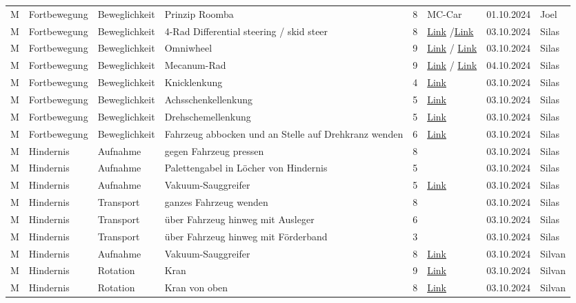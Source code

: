 \documentclass[../main.tex]{subfiles}
\begin{document}
\begin{longtable}{lp{2cm}p{2cm}p{4cm}clcl}
M & Fortbewegung & Beweglichkeit & Prinzip Roomba & 8 & MC-Car & 01.10.2024 & Joel
\tabularnewline
M & Fortbewegung & Beweglichkeit & 4-Rad Differential steering / \newline skid steer & 8 & \href{https://en.wikipedia.org/wiki/Differential_steering}{Link} /\href{https://science.howstuffworks.com/transport/engines-equipment/skid-steer2.htm}{Link} & 03.10.2024 & Silas
\tabularnewline
M & Fortbewegung & Beweglichkeit & Omniwheel & 9 & \href{https://de.wikipedia.org/wiki/Allseitenrad}{Link} / \href{https://www.youtube.com/watch?v=wwQQnSWqB7A}{Link} & 03.10.2024 & Silas
\tabularnewline
M & Fortbewegung & Beweglichkeit & Mecanum-Rad & 9 & \href{https://de.wikipedia.org/wiki/Mecanum-Rad}{Link} / \href{https://www.youtube.com/watch?v=noqBUEgyQ8A}{Link} & 04.10.2024 & Silas
\tabularnewline
M & Fortbewegung & Beweglichkeit & Knicklenkung & 4 & \href{https://de.wikipedia.org/wiki/Knicklenkung}{Link} & 03.10.2024 & Silas
\tabularnewline
M & Fortbewegung & Beweglichkeit & Achsschenkellenkung & 5 & \href{https://de.wikipedia.org/wiki/Achsschenkel}{Link} & 03.10.2024 & Silas
\tabularnewline
M & Fortbewegung & Beweglichkeit & Drehschemellenkung & 5 & \href{https://www.staplerberater.de/auswahlkriterien/lenkungsarten}{Link} & 03.10.2024 & Silas
\tabularnewline
M & Fortbewegung & Beweglichkeit & Fahrzeug abbocken und an Stelle auf Drehkranz wenden & 6 & \href{https://www.kaiserkraft.ch/hubgeraete/hub-und-verladetische/auto-niveaugeraet-mit-drehscheibe/drehscheiben-1110-mm/p/M1142876/?articleNumber=118558&lang=de_CH&customerType=B2C&lang=&infinity=ict2~net~gaw~cmp~PM_DE-shopping24-Jarvis-0~ag~~ar~~kw~~mt~&gad_source=1&gclid=CjwKCAjwgfm3BhBeEiwAFfxrGxsQhJoEWwY3dNM_OYKFg2NOgoHXLP2OeyLmOZFTVnzHt7PvNpgCbhoCACQQAvD_BwE}{Link} & 03.10.2024 & Silas
\tabularnewline

M & Hindernis & Aufnahme & gegen Fahrzeug pressen & 8 &  & 03.10.2024 & Silas
\tabularnewline
M & Hindernis & Aufnahme & Palettengabel in Löcher von Hindernis  & 5 &  & 03.10.2024 & Silas
\tabularnewline
M & Hindernis & Aufnahme & Vakuum-Sauggreifer & 5 & \href{https://www.schmalz.com/de-ch/glossar/vakuumgreifer/}{Link} & 03.10.2024 & Silas
\tabularnewline
M & Hindernis & Transport & ganzes Fahrzeug wenden & 8 &  & 03.10.2024 & Silas
\tabularnewline
M & Hindernis & Transport & über Fahrzeug hinweg mit Ausleger & 6 &  & 03.10.2024 & Silas
\tabularnewline
M & Hindernis & Transport & über Fahrzeug hinweg mit Förderband & 3 &  & 03.10.2024 & Silas
\tabularnewline
M & Hindernis & Aufnahme & Vakuum-Sauggreifer & 8 & \href{https://www.youtube.com/shorts/alxwWgzSVss}{Link}& 03.10.2024 & Silvan
\tabularnewline
M & Hindernis & Rotation & Kran & 9 & \href{https://www.youtube.com/watch?v=VZRFHJfUkq4&feature=youtu.be}{Link}& 03.10.2024 & Silvan
\tabularnewline
M & Hindernis & Rotation & Kran von oben & 8 & \href{https://www.youtube.com/watch?v=J7LGSNhFTU4}{Link}& 03.10.2024 & Silvan
\tabularnewline


\end{longtable}
\end{document}
